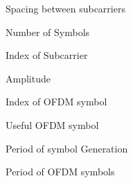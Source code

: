 \begin{description}[labelsep=5em, align=left,labelindent=2cm]
\item[$\Delta f$] Spacing between subcarriers
\item[$N$]        Number of Symbols
\item[$n$]        Index of Subcarrier
\item[$a$]        Amplitude
\item[$m$]        Index of OFDM symbol
\item[$sm$]       Useful OFDM symbol
\item[$T_u$]      Period of symbol Generation
\item[$T_s$]      Period of OFDM symbols
\end{description}

